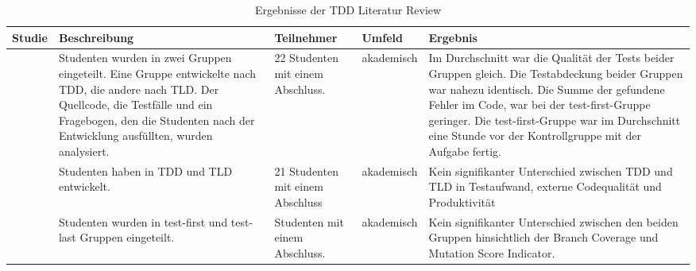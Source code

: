 \begin{table*}[tbh]
\renewcommand{\arraystretch}{1.3}
\caption{Ergebnisse der TDD Literatur Review}
\label{table:TDDLiteraturReview}
\centering
\begin{tabularx}{\textwidth}{@{}Xp{}p{}p{}p{}@{}}
  \toprule
  Studie                                & Beschreibung                                                                                                                                                                                                              & Teilnehmer                                                                                                                                                     & Umfeld     & Ergebnis                                                                                                                                                                         \\ \midrule
  \cite{Causevic2012TestExperiment}     & Studenten wurden in zwei Gruppen eingeteilt. Eine Gruppe entwickelte nach TDD, die andere nach TLD. Der Quellcode, die Testfälle und ein Fragebogen, den die Studenten nach der Entwicklung ausfüllten, wurden analysiert. & 22 Studenten mit einem Abschluss.                                                                                                                                    & akademisch & Im Durchschnitt war die Qualität der Tests beider Gruppen gleich. Die Testabdeckung beider Gruppen war nahezu identisch. Die Summe der gefundene Fehler im Code, war bei der test-first-Gruppe geringer. Die test-first-Gruppe war im Durchschnitt eine Stunde vor der Kontrollgruppe mit der Aufgabe fertig.                                                                                                                \\
  \cite{Fucci2016AnApproach}            & Studenten haben in TDD und TLD entwickelt.                                                                                                                                                                                & 21 Studenten mit einem Abschluss                                                                                                                               & akademisch & Kein signifikanter Unterschied zwischen TDD und TLD in Testaufwand, externe Codequalität und Produktivität                                                                       \\
  \cite{Madeyski2010TheExperiment}      & Studenten wurden in test-first und test-last Gruppen eingeteilt.                                                                                                                                                          & Studenten mit einem Abschluss.                                                                                                                                       & akademisch & Kein signifikanter Unterschied zwischen den beiden Gruppen hinsichtlich der Branch Coverage und Mutation Score Indicator.                                                        \\ \bottomrule
\end{tabularx}
\end{table*}

